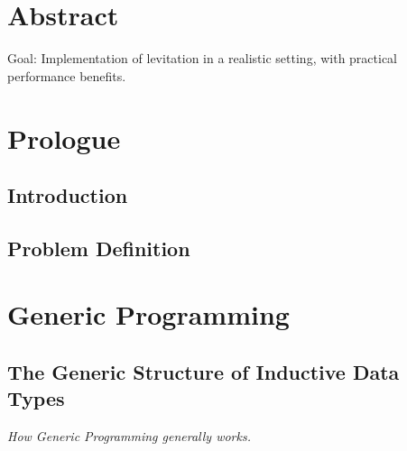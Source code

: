 \documentclass{ituthesis}
\begin{document}

\frontmatter

\thetitlepage
\newpage

\chapter*{Abstract}
Goal: Implementation of levitation in a realistic setting, with practical performance benefits.

\cleardoublepage
\setcounter{tocdepth}{1}
\tableofcontents

\mainmatter

\midsloppy
\sloppybottom

\chapter{Prologue}
\label{cha:Prologue}
\section{Introduction}
\label{sec:Introduction}
\section{Problem Definition}
\label{sec:ProblemDefinition}
\chapter{Generic Programming}
\label{cha:GenericProgramming}
\section{The Generic Structure of Inductive Data Types}
\label{sec:TheGenericStructureofInductiveDataTypes}
\textit{How Generic Programming generally works.}
\end{document}
